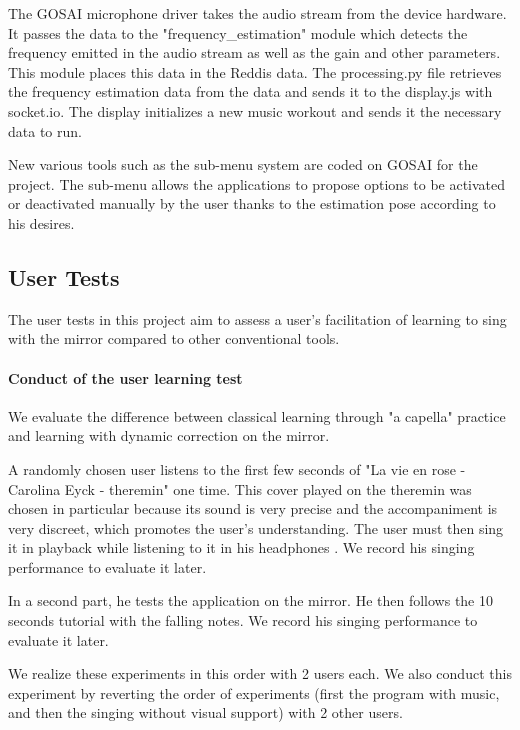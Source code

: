 The GOSAI microphone driver takes the audio stream from the device hardware. It passes the data to the "frequency\_estimation" module which detects the frequency emitted in the audio stream as well as the gain and other parameters. This module places this data in the Reddis data. The processing.py file retrieves the frequency estimation data from the data and sends it to the display.js with socket.io. The display initializes a new music workout and sends it the necessary data to run.

New various tools such as the sub-menu system are coded on GOSAI for the project. The sub-menu allows the applications to propose options to be activated or deactivated manually by the user thanks to the estimation pose according to his desires.

\subsection{User Tests}

The user tests in this project aim to assess a user’s facilitation of learning to sing with the
mirror compared to other conventional tools.

\paragraph{Conduct of the user learning test}

We evaluate the difference between classical learning through "a capella" practice and learning with dynamic correction on the mirror. 

A randomly chosen user listens to the first few seconds of "La vie en rose - Carolina Eyck - theremin"  \cite{carolina_eyck_theremine} one time. This cover played on the theremin was chosen in particular because its sound is very precise and the accompaniment is very discreet, which promotes the user's understanding. The user must then sing it in playback while listening to it in his headphones .
We record his singing performance to evaluate it later.

In a second part, he tests the application on the mirror. He then follows the 10 seconds tutorial with the falling notes. We record his singing performance to evaluate it later.

We realize these experiments in this order with 2 users each. We also conduct this experiment by reverting the order of experiments (first the program with music, and then the singing without visual support) with 2 other users.

